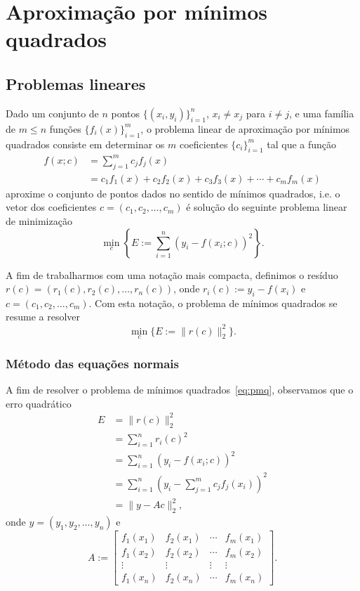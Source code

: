 

\chapter{Aproximação por mínimos quadrados}\label{cap_ajuste}
\thispagestyle{fancy}

\section{Problemas lineares}\label{cap_ajuste_sec_prob_lin}

Dado um conjunto de $n$ pontos $\{(x_i,y_i)\}_{i=1}^n$, $x_i\neq x_j$ para $i\neq j$, e uma família de $m \leq n$ funções $\{f_i(x)\}_{i=1}^m$, o problema linear de aproximação por mínimos quadrados consiste em determinar os $m$ coeficientes $\{c_i\}_{i=1}^m$ tal que a função
\begin{align}    
  f(x;c) &= \sum_{j=1}^m c_jf_j(x) \\
         &= c_1f_1(x) + c_2f_2(x) + c_3f_3(x) + \cdots + c_mf_m(x)
\end{align}
aproxime o conjunto de pontos dados no sentido de mínimos quadrados, i.e. o vetor dos coeficientes $c = (c_1, c_2, \dotsc, c_m)$ é solução do seguinte problema linear de minimização
\begin{equation}
  \min_{c} \left\{E:= \sum_{i=1}^n (y_i - f(x_i;c))^2\right\}.
\end{equation}

A fim de trabalharmos com uma notação mais compacta, definimos o resíduo $r(c) = (r_1(c), r_2(c), \dotsc, r_n(c))$, onde $r_i(c) := y_i - f(x_i)$ e $c = (c_1, c_2, \dotsc, c_m)$. Com esta notação, o problema de mínimos quadrados se resume a resolver
\begin{equation}\label{eq:pmq}
  \min_{c} \{E := \|r(c)\|_2^2\}.
\end{equation}

\subsection{Método das equações normais}

A fim de resolver o problema de mínimos quadrados~\eqref{eq:pmq}, observamos que o erro quadrático
\begin{align}
  E &= \|r(c)\|_2^2 \\
    &= \sum_{i=1}^n r_i(c)^2 \\
    &= \sum_{i=1}^n \left(y_i - f(x_i;c)\right)^2 \\
    &= \sum_{i=1}^n \left(y_i - \sum_{j=1}^m c_jf_j(x_i)\right)^2 \\
    &= \|y - Ac\|_2^2,
\end{align}
onde $y = (y_1, y_2, \dotsc, y_n)$ e
\begin{equation}
  A :=
  \begin{bmatrix}
    f_1(x_1) & f_2(x_1) & \cdots & f_m(x_1) \\
    f_1(x_2) & f_2(x_2) & \cdots & f_m(x_2) \\
    \vdots & \vdots & \vdots & \vdots \\
    f_1(x_n) & f_2(x_n) & \cdots & f_m(x_n)
  \end{bmatrix}.
\end{equation}

